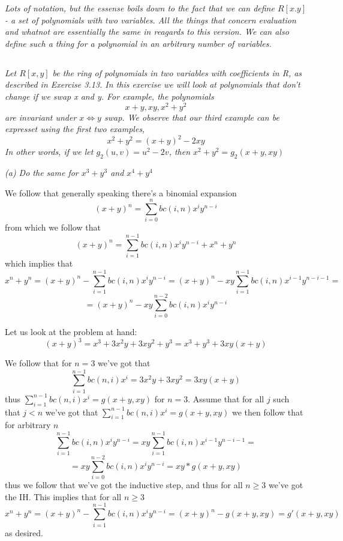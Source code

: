 \documentclass[11pt,oneside,titlepage]{book}
\DeclareMathOperator \lra {\Leftrightarrow}
\begin{document}
\textit{Lots of notation, but the essense boils down to the fact that
we can define $R[x. y]$ - a set of polynomials with two variables. All
the things that concern evaluation and whatnot are essentially the
same in reagards to this version. We can also define such a thing for
a polynomial in an arbitrary number of variables.}

\subsection{}

\textit{Let $R[x, y]$ be the ring of polynomials in two variables with
coefficients in R, as described in Exercise 3.13. In this exercise we
will look at polynomials that don’t change if we swap x and y. For
example, the polynomials
$$x + y, xy, x^2 + y^2$$
are invariant under $x \lra y$ swap. We observe that our third example
can be expresset using the first two examples,
$$x^2 + y^2 = (x + y)^2 - 2xy$$
In other words, if we let $g_2(u, v) = u^2 - 2v$, then $x^2 + y^2 = g_2(x + y, xy)$}

\textit{(a) Do the same for $x^3 + y^3$ and $x^4 + y^4$}

We follow that generally speaking there's a binomial expansion
$$(x + y)^n = \sum_{i = 0}^n {bc(i, n)x^iy^{n - i}}$$
from which we follow that
$$(x + y)^n = \sum_{i = 1}^{n - 1} {bc(i, n)x^iy^{n - i}} + x^n + y^n$$
which implies that
$$ x^n + y^n = (x + y)^n -  \sum_{i = 1}^{n - 1} {bc(i, n)x^iy^{n - i}} =
(x + y)^n -  xy \sum_{i = 1}^{n - 1} {bc(i, n)x^{i - 1}y^{n - i - 1}} = $$
$$ = (x + y)^n -  xy \sum_{i = 0}^{n - 2} {bc(i, n)x^{i}y^{n - i}} $$

Let us look at the problem at hand:
$$(x + y)^3 = x^3 + 3x^2y + 3xy^2 + y^3 = x^3 + y^3 + 3xy(x + y)$$

We follow that for $n = 3$ we've got that
$$\sum_{i = 1}^{n - 1}{bc(n, i) x^i} = 3x^2y + 3xy^2 = 3xy(x + y)$$
thus $\sum_{i = 1}^{n - 1}{bc(n, i) x^i} = g(x + y, xy)$ for $n = 3$.
Assume that for all $j$ such that $j < n$ we've got that $\sum_{i =
1}^{n - 1}{bc(n, i) x^i} = g(x + y, xy)$
we then follow that for arbitrary $n$
$$ \sum_{i = 1}^{n - 1} {bc(i, n)x^iy^{n - i}} =
xy \sum_{i = 1}^{n - 1} {bc(i, n)x^{i - 1}y^{n - i - 1}} = $$
$$ = xy \sum_{i = 0}^{n - 2} {bc(i, n)x^{i}y^{n - i}}  = xy * g(x + y, xy)$$
thus we follow that we've got the inductive step, and thus for all $n
\geq 3$ we've got the IH. This implies that for all $n \geq 3$
$$x^n + y^n = (x + y)^n -  \sum_{i = 1}^{n - 1} {bc(i, n)x^iy^{n - i}} =
(x + y)^n - g(x + y, xy) = g'(x + y, xy)$$
as desired.
\end{document}
